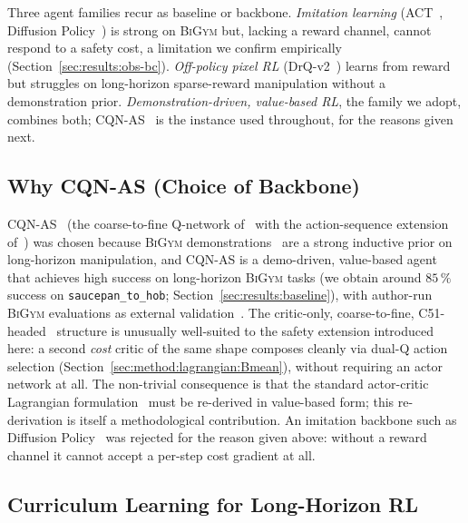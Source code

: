 \documentclass[11pt,a4paper]{report}
\newcommand{\bigym}{\textsc{BiGym}}
\newcommand{\cqnas}{CQN-AS}
\begin{document}
Three agent families recur as baseline or backbone.
\emph{Imitation learning} (ACT~\cite{zhao2023act}, Diffusion
Policy~\cite{chi2023diffusion}) is strong on \bigym{} but, lacking a
reward channel, cannot respond to a safety cost, a limitation we
confirm empirically (Section~\ref{sec:results:obs-bc}).
\emph{Off-policy pixel RL} (DrQ-v2~\cite{yarats2021drqv2}) learns
from reward but struggles on long-horizon sparse-reward manipulation
without a demonstration prior. \emph{Demonstration-driven,
value-based RL}, the family we adopt, combines both;
\cqnas{}~\cite{seo2024cqnas} is the instance used throughout, for
the reasons given next.

\subsection{Why \cqnas{} (Choice of Backbone)}
\label{sec:bg:rl:cqnas}

\cqnas{}~\cite{seo2024cqnas,seo2025actionsequence} (the
coarse-to-fine Q-network of~\cite{seo2024cqnas} with the
action-sequence extension of~\cite{seo2025actionsequence}) was
chosen because \bigym{}
demonstrations~\cite{chernyadev2024bigym} are a strong inductive
prior on long-horizon manipulation, and \cqnas{} is a demo-driven,
value-based agent that achieves high success on long-horizon
\bigym{} tasks (we obtain around $85\,\%$ success on
\texttt{saucepan\_to\_hob}; Section~\ref{sec:results:baseline}),
with author-run \bigym{} evaluations as external
validation~\cite{seo2024cqnas,chernyadev2024bigym}. The critic-only,
coarse-to-fine, C51-headed~\cite{bellemare2017c51} structure is
unusually well-suited to the safety extension introduced here: a
second \emph{cost} critic of the same shape composes cleanly via
dual-Q action selection (Section~\ref{sec:method:lagrangian:Bmean}),
without requiring an actor network at all. The non-trivial
consequence is that the standard actor-critic Lagrangian
formulation~\cite{ray2019safetygym,stooke2020pid} must be re-derived
in value-based form; this re-derivation is itself a methodological
contribution. An imitation backbone such as Diffusion
Policy~\cite{chi2023diffusion} was rejected for the reason given
above: without a reward channel it cannot accept a per-step cost
gradient at all.

\subsection{Curriculum Learning for Long-Horizon RL}
\label{sec:bg:rl:curriculum}
\end{document}
